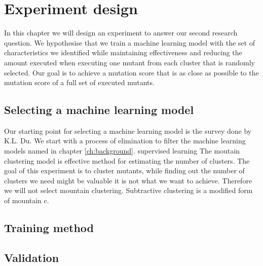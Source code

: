 \documentclass[../../main]{subfiles}
\begin{document}
\clearpage
\section{Experiment design}
In this chapter we will design an experiment to answer our second research question.
We hypothesise that we train a machine learning model with the set of characteristics we identified
while maintaining effectiveness and reducing the amount executed when executing one mutant from each cluster that is randomly selected.
Our goal is to achieve a mutation score that is as close as possible to the mutation score of a full set of executed mutants.
\newline
{}

\subsection{Selecting a machine learning model}
Our starting point for selecting a machine learning model is the survey done by K.L. Du\cite{Du2010Clustering:Approach}.
We start with a process of elimination to filter the machine learning models named in chapter \ref{ch:background}.
\newline
supervised learning
\newline
The moutain clustering model is effective method for estimating the number of clusters\cite{Du2010Clustering:Approach}. 
The goal of this experiment is to cluster mutants, while finding out the number of clusters we need might be valuable it is not what we want to achieve. Therefore we will not select mountain clustering.
Subtractive clustering is a modified form of mountain c\cite{Du2010Clustering:Approach}. 
\newline

\subsection{Training method}

\subsection{Validation}
\end{document}
